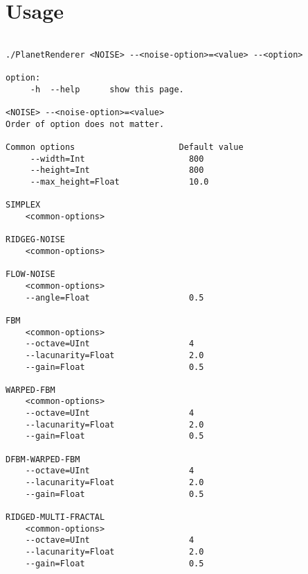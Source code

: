 \section*{Usage}

\begin{center}
\begin{lstlisting}[basicstyle=\small]

./PlanetRenderer <NOISE> --<noise-option>=<value> --<option>

option:
	 -h  --help      show this page.

<NOISE> --<noise-option>=<value>
Order of option does not matter.

Common options                     Default value
	 --width=Int                     800
	 --height=Int                    800
	 --max_height=Float              10.0

SIMPLEX
	<common-options>

RIDGEG-NOISE
	<common-options>

FLOW-NOISE
	<common-options>
	--angle=Float                    0.5

FBM
	<common-options> 
	--octave=UInt                    4
	--lacunarity=Float               2.0 
	--gain=Float                     0.5

WARPED-FBM 
	<common-options> 
	--octave=UInt                    4
	--lacunarity=Float               2.0
	--gain=Float                     0.5

DFBM-WARPED-FBM 
	--octave=UInt                    4
	--lacunarity=Float               2.0
	--gain=Float                     0.5

RIDGED-MULTI-FRACTAL 
	<common-options> 
	--octave=UInt                    4
	--lacunarity=Float               2.0
	--gain=Float                     0.5

\end{lstlisting}
\end{center}